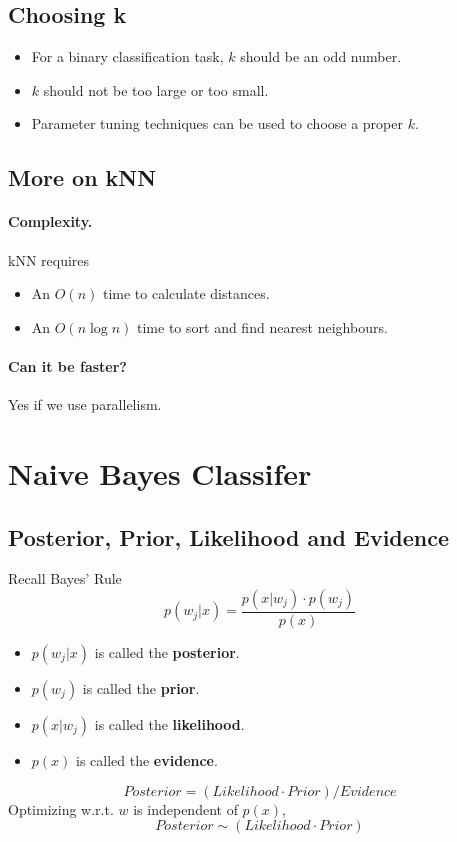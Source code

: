     \subsection{Choosing k}
        \begin{itemize}
            \item For a binary classification task, $k$ should be an odd number.
            \item $k$ should not be too large or too small.
            \item Parameter tuning techniques can be used to choose a proper $k$.
        \end{itemize}

    \subsection{More on kNN}
        \paragraph{Complexity.}
        kNN requires
        \begin{itemize}
            \item An $O(n)$ time to calculate distances.
            \item An $O(n\log n)$ time to sort and find nearest neighbours.
        \end{itemize}
        \paragraph{Can it be faster?}
        Yes if we use parallelism.


\section{Naive Bayes Classifer}

    \subsection{Posterior, Prior, Likelihood and Evidence}
        Recall Bayes' Rule
        \[ p(w_j|x) = \frac{p(x|w_j) \cdot p(w_j)}{p(x)} \]
        \begin{itemize}
            \item $p(w_j|x)$ is called the \textbf{posterior}.
            \item $p(w_j)$ is called the \textbf{prior}.
            \item $p(x|w_j)$ is called the \textbf{likelihood}.
            \item $p(x)$ is called the \textbf{evidence}.
        \end{itemize}
        \[ Posterior = (Likelihood \cdot Prior) / Evidence \]
        Optimizing w.r.t. $w$ is independent of $p(x)$,
        \[ Posterior \sim (Likelihood \cdot Prior) \]

